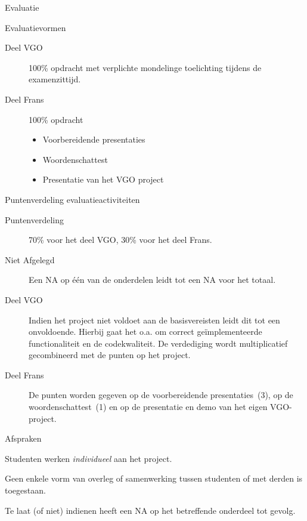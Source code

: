\documentclass{studiewijzer}
\begin{document}
\begin{categorybox}{Evaluatie}
    \begin{category}{Evaluatievormen}
        \begin{description}
            \item[Deel VGO] 100\% opdracht met verplichte mondelinge toelichting tijdens de examenzittijd.
            \item[Deel Frans] 100\% opdracht
                    \begin{itemize}
                    \item Voorbereidende presentaties
                    \item Woordenschattest
                    \item Presentatie van het VGO project
                    \end{itemize}
        \end{description}
    \end{category}

    \begin{category}{Puntenverdeling evaluatieactiviteiten}
        \begin{description}
            \item[Puntenverdeling] 70\% voor het deel VGO, 30\% voor het deel Frans.
            \item[Niet Afgelegd] Een NA op \'e\'en van de onderdelen leidt tot een NA voor het totaal.
            \item[Deel VGO] Indien het project niet voldoet aan de basisvereisten leidt dit tot een onvoldoende.
                    Hierbij gaat het o.a. om correct ge\"implementeerde functionaliteit en de codekwaliteit.
                    De verdediging wordt multiplicatief gecombineerd met de punten op het project.
            \item[Deel Frans] De punten worden gegeven op de voorbereidende
                    presentaties~(3), op de woordenschattest~(1) en op de presentatie
                    en demo van het eigen VGO-project.
        \end{description}
    \end{category}

    \begin{category}{Afspraken}
        \begin{items}
            \item Studenten werken \emph{individueel} aan het project.
            \item Geen enkele vorm van overleg of samenwerking tussen studenten of met derden is toegestaan.
            \item Te laat (of niet) indienen heeft een NA op het betreffende onderdeel tot gevolg.
        \end{items}
    \end{category}


\end{categorybox}
\end{document}
